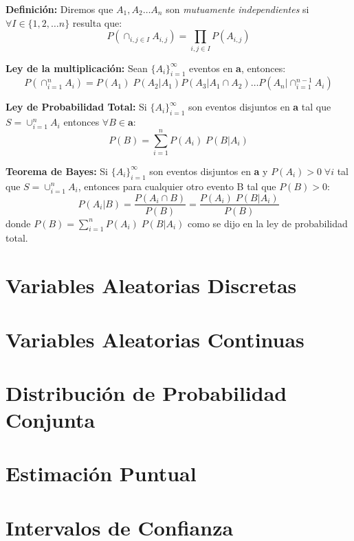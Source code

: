 \documentclass[12pt,a4paper]{report}
\begin{document}
		\vspace{3mm}
		\par \textbf{Definición:} Diremos que $A_{1}, A_{2} \dotsc A_{n}$ son \textit{mutuamente independientes} si $\forall I \in \lbrace 1, 2, \dotsc n \rbrace$ resulta que:
		\[
			P(\cap_{i, j \in I} A_{i, j}) = \prod_{i, j \in I} P(A_{i, j})
		\]
		
		\vspace{3mm}
		\par \textbf{Ley de la multiplicación:} Sean $\lbrace A_{i} \rbrace_{i=1}^{\infty}$
eventos en \textbf{a}, entonces:
		\[
			P(\cap_{i = 1}^{n} A_{i}) = P(A_{1}) \; P(A_{2} | A_{1}) P(A_{3} | A_{1} \cap A_{2}) \dotsc P(A_{n} | \cap_{i=1}^{n - 1} A_{i})
		\]
		
		\vspace{3mm}
		\par \textbf{Ley de Probabilidad Total:} Si $\lbrace A_{i} \rbrace_{i=1}^{\infty}$ son eventos disjuntos en \textbf{a} tal que $S = \cup_{i=1}^{n} A_{i}$ entonces $\forall B \in \textbf{a}$:
		\[
			P(B) = \sum_{i=1}^{n} P(A_{i}) \; P(B | A_{i})
		\]
		
		\vspace{3mm}
		\par \textbf{Teorema de Bayes:} Si $\lbrace A_{i} \rbrace_{i=1}^{\infty}$ son eventos disjuntos en \textbf{a} y $P(A_{i}) > 0 \; \forall i$ tal que $S = \cup_{i=1}^{n} A_{i}$, entonces para cualquier otro evento B tal que $P(B) > 0$:
		\[
			P(A_{i} | B) = \frac{P(A_{i} \cap B)}{P(B)} = \frac{P(A_{i}) \; P(B | A_{i})}{P(B)}
		\]
		donde $P(B) = \sum_{i=1}^{n} P(A_{i}) \; P(B | A_{i})$ como se dijo en la ley de probabilidad total.
	
	
\chapter{Variables Aleatorias Discretas}
\chapter{Variables Aleatorias Continuas}
\chapter{Distribución de Probabilidad Conjunta}
\chapter{Estimación Puntual}
\chapter{Intervalos de Confianza}
\end{document}

